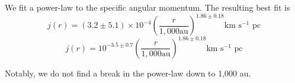 We fit a power-law to the specific angular momentum. 
The resulting best fit is 
\begin{equation}
j(r) = (3.2\pm5.1)\times 10^{-4}\left( \frac{r}{1,000 \textrm{au}}\right)^{1.86\pm0.18} \textrm{km s$^{-1}$ pc}
\end{equation}
\begin{equation}
j(r) = 10^{-3.5\pm 0.7}\left( \frac{r}{1,000 \textrm{au}}\right)^{1.86\pm0.18} \textrm{km s$^{-1}$ pc}
\end{equation}
  
Notably, we do not find a break in the power-law down to 1,000 au.
  
  
  
  